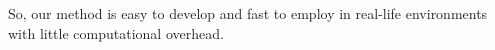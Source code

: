 So, our method is easy to develop and fast to employ in real-life environments with little computational overhead.






